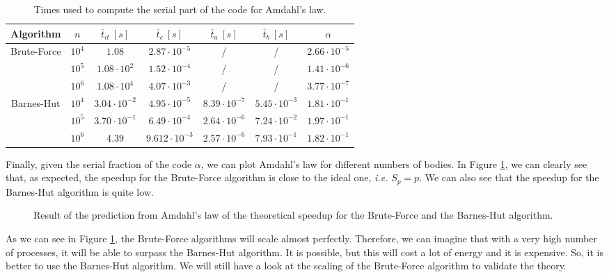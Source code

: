 \documentclass[10pt,a4paper]{article}
\begin{document}
\begin{table}[h]
\centering
\begin{tabular}{|c||c|c|c|c|c||c|}
\hline
Algorithm & $n$ & $\overline{t}_{it}~[s]$ & $\overline{t}_{c}~[s]$ & $\overline{t}_{a}~[s]$ & $\overline{t}_{b}~[s]$ & $\alpha$ \\
\hline \hline
\multirow{3}{*}{Brute-Force} & $10^4$ & $1.08$ & $2.87\cdot 10^{-5}$ & / & / & $2.66\cdot10^{-5}$ \\ \cline{2-7}
& $10^5$ & $1.08\cdot10^2$ & $1.52\cdot 10^{-4}$ & / & / & $1.41\cdot10^{-6}$ \\ \cline{2-7}
& $10^6$ & $1.08\cdot10^4$ & $4.07\cdot 10^{-3}$ & / & / & $3.77\cdot10^{-7}$ \\ \hline \hline
\multirow{3}{*}{Barnes-Hut} & $10^4$ & $3.04\cdot10^{-2}$ & $4.95\cdot 10^{-5}$ & $8.39\cdot10^{-7}$ & $5.45\cdot10^{-3}$ & $1.81\cdot10^{-1}$ \\ \cline{2-7}
& $10^5$ & $3.70\cdot10^{-1}$ & $6.49\cdot10^{-4}$ & $2.64\cdot10^{-6}$ & $7.24\cdot10^{-2}$ & $1.97\cdot10^{-1}$ \\ \cline{2-7}
& $10^6$ & $4.39$ & $9.612\cdot10^{-3}$ & $2.57\cdot10^{-6}$ & $7.93\cdot10^{-1}$ & $1.82\cdot10^{-1}$ \\ \hline
\end{tabular}
   \caption{Times used to compute the serial part of the code for Amdahl's law.}
   \label{tab:amdahl}  
\end{table}

Finally, given the serial fraction of the code $\alpha$, we can plot Amdahl's law for different numbers of bodies. In Figure \ref{fig:amdahl}, we can clearly see that, as expected, the speedup for the Brute-Force algorithm is close to the ideal one, {\it i.e.} $S_p=p$. We can also see that the speedup for the Barnes-Hut algorithm is quite low. 

\begin{figure}[H]
\centering

\caption{\label{fig:amdahl} Result of the  prediction from Amdahl's law of the theoretical speedup for the Brute-Force and the Barnes-Hut algorithm.}
\end{figure}

As we can see in Figure \ref{fig:amdahl}, the Brute-Force algorithms will scale almost perfectly. Therefore, we can imagine that with a very high number of processes, it will be able to surpass the Barnes-Hut algorithm. It is possible, but this will cost a lot of energy and it is expensive. So, it is better to use the Barnes-Hut algorithm. We will still have a look at the scaling of the Brute-Force algorithm to validate the theory.
\end{document}
